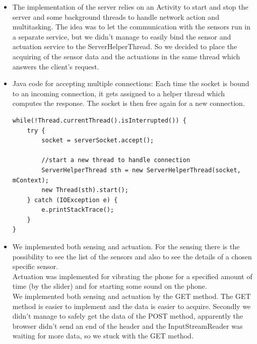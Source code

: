 \documentclass{report}
\begin{document}
\begin{itemize}
	\item The implementation of the server relies on an Activity to start and stop the server and some background threads to handle network action and multitasking. The idea was to let the communication with the sensors run in a separate service, but we didn't manage to easily bind the sensor and actuation service to the ServerHelperThread. So we decided to place the acquiring of the sensor data and the actuations in the same thread which answers the client's request.  
	\item Java code for accepting multiple connections: Each time the socket is bound to an incoming connection, it gets assigned to a helper thread which computes the response. The socket is then free again for a new connection.
		\begin{lstlisting}
while(!Thread.currentThread().isInterrupted()) {
	try {
		socket = serverSocket.accept();	
							
		//start a new thread to handle connection
		ServerHelperThread sth = new ServerHelperThread(socket, mContext);
		new Thread(sth).start();
	} catch (IOException e) {
		e.printStackTrace();
	}
}	
		\end{lstlisting}
	\item We implemented both sensing and actuation. For the sensing there is the possibility to see the list of the sensors and also to see the details of a chosen specific sensor. \\
	Actuation was implemented for vibrating the phone for a specified amount of time (by the slider) and for starting some sound on the phone. \\
	We implemented both sensing and actuation by the GET method. The GET method is easier to implement and the data is easier to acquire. Secondly we didn't manage to safely get the data of the POST method, apparently the browser didn't send an end of the header and the InputStreamReader was waiting for more data, so we stuck with the GET method.
\end{itemize}
\end{document}

